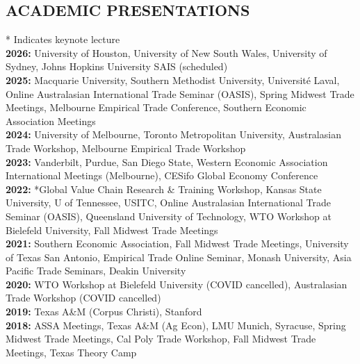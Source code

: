 \documentclass[11pt]{res}
\begin{document}
\begin{resume}
\section{ACADEMIC PRESENTATIONS}\vspace{1.5mm}
* Indicates keynote lecture\vspace{1.5mm}\\
{\bf 2026:} University of Houston, University of New South Wales, University of Sydney, Johns Hopkins University SAIS (scheduled) \\
{\bf 2025:} Macquarie University, Southern Methodist University, Universit\'e Laval, Online Australasian International Trade Seminar (OASIS), Spring Midwest Trade Meetings, Melbourne Empirical Trade Conference, Southern Economic Association Meetings \\
{\bf 2024:} University of Melbourne, Toronto Metropolitan University, Australasian Trade Workshop, Melbourne Empirical Trade Workshop\vspace{1.5mm}\\
{\bf 2023:} Vanderbilt, Purdue, San Diego State, Western Economic Association International Meetings (Melbourne), CESifo Global Economy Conference\vspace{1.5mm}\\
{\bf 2022:} *Global Value Chain Research \& Training Workshop, Kansas State University, U of Tennessee, USITC, Online Australasian International Trade Seminar (OASIS), Queensland University of Technology, WTO Workshop at Bielefeld University, Fall Midwest Trade Meetings\vspace{1.5mm}\\
{\bf 2021:} Southern Economic Association, Fall Midwest Trade Meetings, University of Texas San Antonio, Empirical Trade Online Seminar, Monash University, Asia Pacific Trade Seminars, Deakin University \vspace{1.5mm}\\
{\bf 2020:} WTO Workshop at Bielefeld University (COVID cancelled), Australasian Trade Workshop (COVID cancelled)\vspace{1.5mm}\\
{\bf 2019:} Texas A\&M (Corpus Christi), Stanford \vspace{1.5mm}\\
{\bf 2018:} ASSA Meetings, Texas A\&M (Ag Econ), LMU Munich, Syracuse, Spring Midwest Trade Meetings, Cal Poly Trade Workshop, Fall Midwest Trade Meetings, Texas Theory Camp \vspace{1.5mm}\\

\end{resume}
\end{document}
